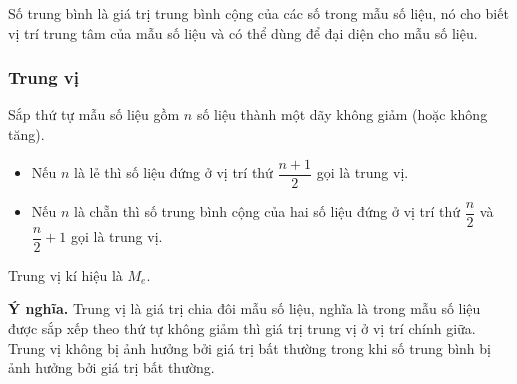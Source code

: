 Số trung bình là giá trị trung bình cộng của các số trong mẫu số liệu, nó cho biết vị trí trung tâm của mẫu số liệu và có thể dùng để đại diện cho mẫu số liệu.

\subsubsection{Trung vị}
\begin{boxdn}
	Sắp thứ tự mẫu số liệu gồm $n$ số liệu thành một dãy không giảm (hoặc không tăng).
	\begin{itemize}
		\item Nếu $n$ là lẻ thì số liệu đứng ở vị trí thứ $\dfrac{n+1}{2}$ gọi là trung vị.
		\item Nếu $n$ là chẵn thì số trung bình cộng của hai số liệu đứng ở vị trí thứ $\dfrac{n}{2}$ và $\dfrac{n}{2}+1$ gọi là trung vị.
	\end{itemize}
	Trung vị kí hiệu là $M_e$.
\end{boxdn}
\textbf{Ý nghĩa.} Trung vị là giá trị chia đôi mẫu số liệu, nghĩa là trong mẫu số liệu được sắp xếp theo thứ tự không giảm thì giá trị trung vị ở vị trí chính giữa. Trung vị không bị ảnh hưởng bởi giá trị bất thường trong khi số trung bình bị ảnh hưởng bởi giá trị bất thường.

